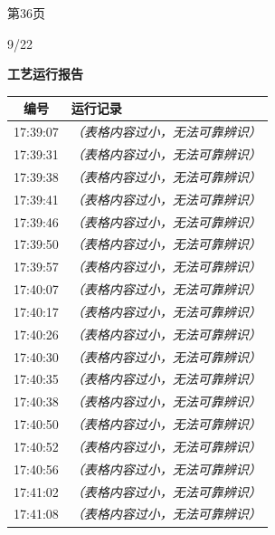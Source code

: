 \documentclass[UTF8,10pt,a4paper,fontset=fandol]{ctexart}
\newcommand{\handwritten}[1]{#1}
\begin{document}
\begin{center}
\begin{minipage}[t]{0.46\textwidth}
\vspace{2mm}
第36页
\end{minipage}
\end{center}

\handwritten{9/22}

\newpage

\begin{center}
\begin{minipage}[t]{0.47\textwidth}
\centering
\textbf{工艺运行报告}

\vspace{2pt}
\begin{tabularx}{\linewidth}{|c|X|}
\hline
编号 & 运行记录 \\ \hline
17:39:07 & \textit{（表格内容过小，无法可靠辨识）} \\ \hline
17:39:31 & \textit{（表格内容过小，无法可靠辨识）} \\ \hline
17:39:38 & \textit{（表格内容过小，无法可靠辨识）} \\ \hline
17:39:41 & \textit{（表格内容过小，无法可靠辨识）} \\ \hline
17:39:46 & \textit{（表格内容过小，无法可靠辨识）} \\ \hline
17:39:50 & \textit{（表格内容过小，无法可靠辨识）} \\ \hline
17:39:57 & \textit{（表格内容过小，无法可靠辨识）} \\ \hline
17:40:07 & \textit{（表格内容过小，无法可靠辨识）} \\ \hline
17:40:17 & \textit{（表格内容过小，无法可靠辨识）} \\ \hline
17:40:26 & \textit{（表格内容过小，无法可靠辨识）} \\ \hline
17:40:30 & \textit{（表格内容过小，无法可靠辨识）} \\ \hline
17:40:35 & \textit{（表格内容过小，无法可靠辨识）} \\ \hline
17:40:38 & \textit{（表格内容过小，无法可靠辨识）} \\ \hline
17:40:50 & \textit{（表格内容过小，无法可靠辨识）} \\ \hline
17:40:52 & \textit{（表格内容过小，无法可靠辨识）} \\ \hline
17:40:56 & \textit{（表格内容过小，无法可靠辨识）} \\ \hline
17:41:02 & \textit{（表格内容过小，无法可靠辨识）} \\ \hline
17:41:08 & \textit{（表格内容过小，无法可靠辨识）} \\ \hline

\end{tabularx}
\end{minipage}
\end{center}
\end{document}
